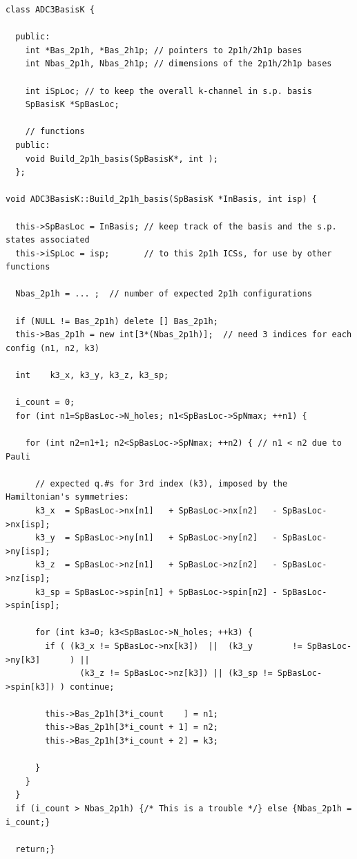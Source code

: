 \begin{lstlisting}
class ADC3BasisK {
  
  public:
    int *Bas_2p1h, *Bas_2h1p; // pointers to 2p1h/2h1p bases
    int Nbas_2p1h, Nbas_2h1p; // dimensions of the 2p1h/2h1p bases
    
    int iSpLoc; // to keep the overall k-channel in s.p. basis
    SpBasisK *SpBasLoc;
    
    // functions
  public:
    void Build_2p1h_basis(SpBasisK*, int );
  };

void ADC3BasisK::Build_2p1h_basis(SpBasisK *InBasis, int isp) {

  this->SpBasLoc = InBasis; // keep track of the basis and the s.p. states associated
  this->iSpLoc = isp;       // to this 2p1h ICSs, for use by other functions

  Nbas_2p1h = ... ;  // number of expected 2p1h configurations
  
  if (NULL != Bas_2p1h) delete [] Bas_2p1h;
  this->Bas_2p1h = new int[3*(Nbas_2p1h)];  // need 3 indices for each config (n1, n2, k3)
  
  int    k3_x, k3_y, k3_z, k3_sp;

  i_count = 0;
  for (int n1=SpBasLoc->N_holes; n1<SpBasLoc->SpNmax; ++n1) {
    
    for (int n2=n1+1; n2<SpBasLoc->SpNmax; ++n2) { // n1 < n2 due to Pauli

      // expected q.#s for 3rd index (k3), imposed by the Hamiltonian's symmetries:
      k3_x  = SpBasLoc->nx[n1]   + SpBasLoc->nx[n2]   - SpBasLoc->nx[isp];
      k3_y  = SpBasLoc->ny[n1]   + SpBasLoc->ny[n2]   - SpBasLoc->ny[isp];
      k3_z  = SpBasLoc->nz[n1]   + SpBasLoc->nz[n2]   - SpBasLoc->nz[isp];
      k3_sp = SpBasLoc->spin[n1] + SpBasLoc->spin[n2] - SpBasLoc->spin[isp];
      
      for (int k3=0; k3<SpBasLoc->N_holes; ++k3) {
        if ( (k3_x != SpBasLoc->nx[k3])  ||  (k3_y        != SpBasLoc->ny[k3]      ) ||
               (k3_z != SpBasLoc->nz[k3]) || (k3_sp != SpBasLoc->spin[k3]) ) continue;
        
        this->Bas_2p1h[3*i_count    ] = n1;
        this->Bas_2p1h[3*i_count + 1] = n2;
        this->Bas_2p1h[3*i_count + 2] = k3;

      }
    }
  }
  if (i_count > Nbas_2p1h) {/* This is a trouble */} else {Nbas_2p1h = i_count;}

  return;}
\end{lstlisting}


